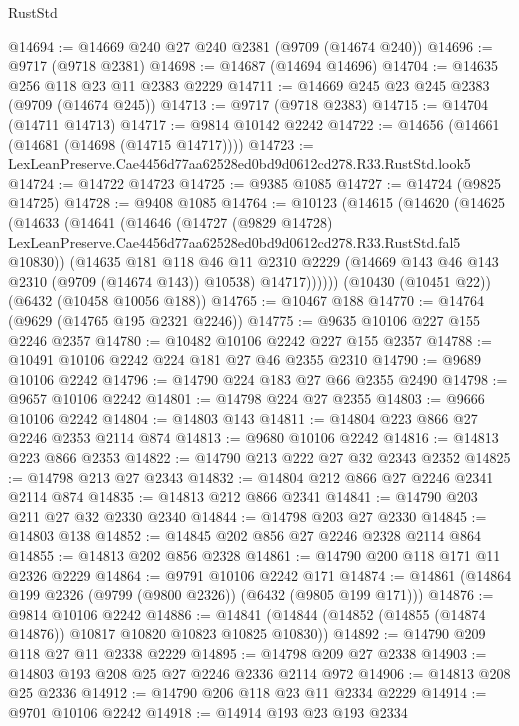 \begin{lexlean}{RustStd}
\begin{coremodule}
@14694 := @14669 @240 @27 @240 @2381 (@9709 (@14674 @240))
@14696 := @9717 (@9718 @2381)
@14698 := @14687 (@14694 @14696)
@14704 := @14635 @256 @118 @23 @11 @2383 @2229
@14711 := @14669 @245 @23 @245 @2383 (@9709 (@14674 @245))
@14713 := @9717 (@9718 @2383)
@14715 := @14704 (@14711 @14713)
@14717 := @9814 @10142 @2242
@14722 := @14656 (@14661 (@14681 (@14698 (@14715 @14717))))
@14723 := LexLeanPreserve.Cae4456d77aa62528ed0bd9d0612cd278.R33.RustStd.look5
@14724 := @14722 @14723
@14725 := @9385 @1085
@14727 := @14724 (@9825 @14725)
@14728 := @9408 @1085
@14764 := @10123
    (@14615
      (@14620
        (@14625
          (@14633
            (@14641
              (@14646
                (@14727
                  (@9829 @14728)
                  LexLeanPreserve.Cae4456d77aa62528ed0bd9d0612cd278.R33.RustStd.fal5
                  @10830))
              (@14635
                @181
                @118
                @46
                @11
                @2310
                @2229
                (@14669 @143 @46 @143 @2310 (@9709 (@14674 @143)) @10538)
                @14717))))))
    (@10430 (@10451 @22))
    (@6432 (@10458 @10056 @188))
@14765 := @10467 @188
@14770 := @14764 (@9629 (@14765 @195 @2321 @2246))
@14775 := @9635 @10106 @227 @155 @2246 @2357
@14780 := @10482 @10106 @2242 @227 @155 @2357
@14788 := @10491 @10106 @2242 @224 @181 @27 @46 @2355 @2310
@14790 := @9689 @10106 @2242
@14796 := @14790 @224 @183 @27 @66 @2355 @2490
@14798 := @9657 @10106 @2242
@14801 := @14798 @224 @27 @2355
@14803 := @9666 @10106 @2242
@14804 := @14803 @143
@14811 := @14804 @223 @866 @27 @2246 @2353 @2114 @874
@14813 := @9680 @10106 @2242
@14816 := @14813 @223 @866 @2353
@14822 := @14790 @213 @222 @27 @32 @2343 @2352
@14825 := @14798 @213 @27 @2343
@14832 := @14804 @212 @866 @27 @2246 @2341 @2114 @874
@14835 := @14813 @212 @866 @2341
@14841 := @14790 @203 @211 @27 @32 @2330 @2340
@14844 := @14798 @203 @27 @2330
@14845 := @14803 @138
@14852 := @14845 @202 @856 @27 @2246 @2328 @2114 @864
@14855 := @14813 @202 @856 @2328
@14861 := @14790 @200 @118 @171 @11 @2326 @2229
@14864 := @9791 @10106 @2242 @171
@14874 := @14861 (@14864 @199 @2326 (@9799 (@9800 @2326)) (@6432 (@9805 @199 @171)))
@14876 := @9814 @10106 @2242
@14886 := @14841 (@14844 (@14852 (@14855 (@14874 @14876)) @10817 @10820 @10823 @10825 @10830))
@14892 := @14790 @209 @118 @27 @11 @2338 @2229
@14895 := @14798 @209 @27 @2338
@14903 := @14803 @193 @208 @25 @27 @2246 @2336 @2114 @972
@14906 := @14813 @208 @25 @2336
@14912 := @14790 @206 @118 @23 @11 @2334 @2229
@14914 := @9701 @10106 @2242
@14918 := @14914 @193 @23 @193 @2334

\end{coremodule}
\end{lexlean}
